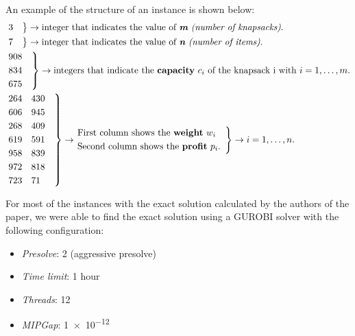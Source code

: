An example of the structure of an instance is shown below:
\[
    \begin{split}
        &\begin{rcases*}
             3 \quad
        \end{rcases*}
        \rightarrow \text{integer that indicates the value of \textit{\textbf{m} (number of knapsacks)}.}\\
        &\begin{rcases*}
             7 \quad
        \end{rcases*}
        \rightarrow \text{integer that indicates the value of \textit{\textbf{n} (number of items)}.}\\
        &\begin{rcases*}
             908 \quad\\
             834\\
             675\\
        \end{rcases*}
        \rightarrow \text{integers that indicate the \textbf{capacity} } c_{i} \text{ of the knapsack i with }
        \space i=1,\dots,m.\\
        &\begin{rcases*}
             264    \quad 430 \quad\\
             606 \quad    945\\
             268 \quad    409\\
             619 \quad    591\\
             958 \quad    839\\
             972 \quad    818\\
             723 \quad    71\\
        \end{rcases*}
        \rightarrow
        \begin{rcases*}
            \text{First column shows the \textbf{weight} } w_{i} \quad \\
            \text{Second column shows the \textbf{profit} } p_{i}.
        \end{rcases*}
        \rightarrow
        \space i=1,\dots,n.
    \end{split}
\]

For most of the instances with the exact solution calculated by the authors of the paper, we were able to
find the exact solution using a GUROBI solver with the following configuration:

\begin{itemize}
    \item \textit{Presolve}: 2 (aggressive presolve)
    \item \textit{Time limit}: 1 hour
    \item \textit{Threads}: 12
    \item \textit{MIPGap}: \num{1e-12}
\end{itemize}

